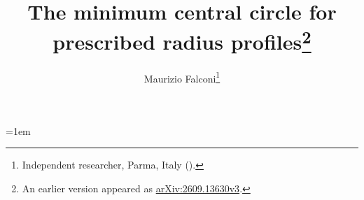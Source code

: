\usepackage{amsfonts,amssymb,graphicx,booktabs}
\emergencystretch=1em
\title{The minimum central circle for prescribed radius profiles\thanks{An earlier version appeared as
\href{https://arxiv.org/abs/2609.13630v3}{arXiv:2609.13630v3}.}}
\author{Maurizio Falconi\thanks{Independent researcher, Parma, Italy
().}}
\pdftrailerid{}
